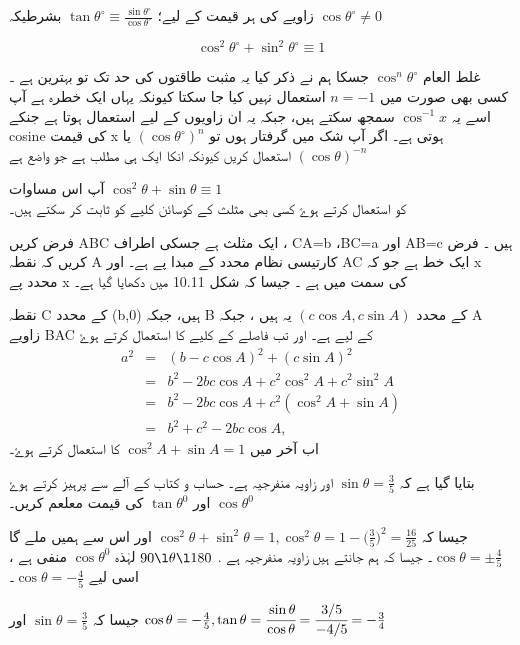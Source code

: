 زاویے کی ہر قیمت کے لیے؛
\( \tan\theta^{\circ}\equiv\frac{\sin\theta^{\circ}}{\cos\theta^{\circ}} \) 
بشرطیکہ \( \cos\theta^{\circ} \neq 0 \) 

\[ \cos^{2}\theta^{\circ}+\sin^{2}\theta^{\circ}\equiv1 \] 

غلط العام  \( \cos^{n}\theta^{\circ} \)  جسکا ہم نے ذکر کیا 
یہ مثبت طاقتوں کی حد تک تو بہترین ہے ۔ کسی بھی صورت میں \( n=-1 \) استعمال نہیں کیا جا سکتا کیونکہ یہاں ایک خطرہ ہے آپ اسے یہ 
\( \cos^{-1}x \) 
سمجھ سکتے ہیں، جبکہ یہ ان زاویوں کے لیے استعمال ہوتا ہے جنکے cosine کی قیمت   x
 ہوتی ہے۔ اگر آپ شک میں گرفتار ہوں تو \( \left( \cos\theta^{\circ} \right)^{n} \)  یا 
\( \left(\cos\theta\right)^{-n} \) 
استعمال کریں کیونکہ انکا ایک ہی مطلب ہے جو واضع ہے

آپ اس مساوات \(\cos^2\theta+\sin\theta \equiv1\)\\ کو استعمال کرتے ہوۓ کسی بھی مثلث کے کوسائن کلیے کو ثابت کر سکتے ہیں۔

فرض کریں ABC ایک  مثلث ہے جسکی اطراف ،   CA=b  ،BC=a
اور  AB=c
ہیں ۔ فرض کریں کہ نقطہ A کارتیسی نظام محدد کے مبدا پے ہے۔ اور   AC  ایک خط ہے جو کہ x محدد پے x کی  سمت میں ہے ۔ جیسا کہ شکل 10.11 میں دکھایا گیا ہے۔ 

نقطہ   C کے محدد  (b,0) ہیں، جبکہ B کے محدد  \((c\cos A,c\sin A)\)    یہ ہیں ، جبکہ A  زاویے   BAC  کے لیے ہے۔ اور تب فاصلے کے کلیے کا استعمال کرتے ہوۓ  
\begin{eqnarray*}
a^{2} &=&(b-c\cos A)^2+(c\sin A)^2\\ 
&=& b^2-2bc\cos A+c^2 \cos^2 A +c^2\sin^2 A\\
&=&b^2-2bc\cos A +c^2 (\cos^2 A+\sin A)\\
&=&b^2+c^2-2bc\cos A,
\end{eqnarray*}
 اب آخر میں \(\cos^2 A+\sin A=1\) کا استعمال کرتے ہوۓ۔

 بتایا گیا ہے کہ \(\sin\theta=\frac{3}{5}\) اور زاویہ منفرجیہ ہے۔ حساب و کتاب کے آلے سے  پرہیز کرتے ہوۓ \( \cos \theta^{0}\)  اور   \( \tan \theta^{0}\) کی قیمت معلعم کریں۔

جیسا کہ \(\cos^2\theta+\sin^2\theta = 1, \cos^2\theta=1-\big(\frac{3}{5})^2=\frac{16}{25}\) اور اس سے ہمیں ملے گا  \(\cos\theta=\pm\frac{4}{5}\)۔ جیسا کہ ہم جانتے ہیں زاویہ منفرجیہ ہے . \( 90\l \theta \l 180\) لہٰذہ \( \cos \theta^{0}\) منفی ہے ، اسی لیے \(\cos\theta=-\frac{4}{5}\)۔

جیسا کہ \(\sin\theta=\frac{3}{5}\) اور \(\cos\theta=-\frac{4}{5},\tan\theta=\cfrac{\sin\theta}{\cos\theta}=\cfrac{3/5}{-4/5}=-\frac{3}{4}\)

